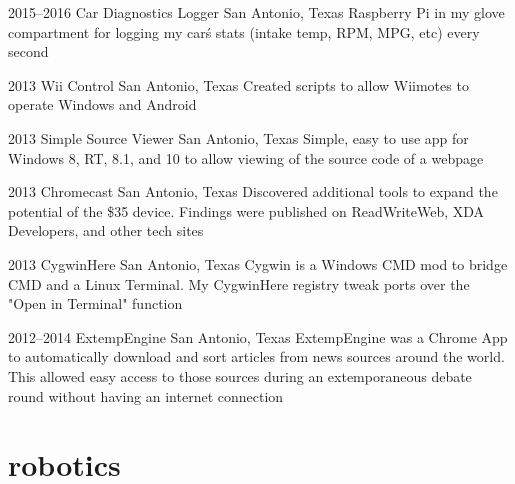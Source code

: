 \documentclass[]{friggeri-cv} %
\begin{document}
\begin{entrylist}
	\entry
	{2015--2016}
	{Car Diagnostics Logger}
	{San Antonio, Texas}
	{Raspberry Pi in my glove compartment for logging my car\'s stats (intake temp, RPM, MPG, etc) every  second}


	\entry
	{2013}
	{Wii Control}
	{San Antonio, Texas}
	{Created scripts to allow Wiimotes to operate Windows and Android}


	\entry
	{2013}
	{Simple Source Viewer}
	{San Antonio, Texas}
	{Simple, easy to use app for Windows 8, RT, 8.1, and 10 to allow viewing of the source code of a webpage}


	\entry
	{2013}
	{Chromecast}
	{San Antonio, Texas}
	{Discovered additional tools to expand the potential of the \$35 device. Findings were published on ReadWriteWeb, XDA Developers, and other tech sites}


	\entry
	{2013}
	{CygwinHere}
	{San Antonio, Texas}
	{Cygwin is a Windows CMD mod to bridge CMD and a Linux Terminal. My CygwinHere registry tweak ports over the "Open in Terminal" function}


	\entry
	{2012--2014}
	{ExtempEngine}
	{San Antonio, Texas}
	{ExtempEngine was a Chrome App to automatically download and sort articles from news sources around the world. This allowed easy access to those sources during an extemporaneous debate round without having an internet connection}

\end{entrylist}


\section{robotics}
\end{document}
